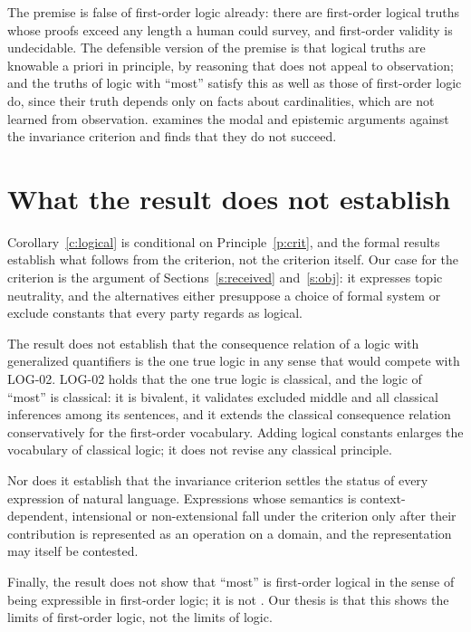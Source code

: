 \documentclass{situationist-preprint}
\begin{document}
\begin{reply}
The premise is false of first-order logic already: there are first-order logical truths whose proofs exceed any length a human could survey, and first-order validity is undecidable. The defensible version of the premise is that logical truths are knowable a priori in principle, by reasoning that does not appeal to observation; and the truths of logic with \enquote{most} satisfy this as well as those of first-order logic do, since their truth depends only on facts about cardinalities, which are not learned from observation. \citet{Sagi2015} examines the modal and epistemic arguments against the invariance criterion and finds that they do not succeed.
\end{reply}

\section{What the result does not establish}

Corollary~\ref{c:logical} is conditional on Principle~\ref{p:crit}, and the formal results establish what follows from the criterion, not the criterion itself. Our case for the criterion is the argument of Sections~\ref{s:received} and~\ref{s:obj}: it expresses topic neutrality, and the alternatives either presuppose a choice of formal system or exclude constants that every party regards as logical.

The result does not establish that the consequence relation of a logic with generalized quantifiers is the one true logic in any sense that would compete with LOG-02. LOG-02 holds that the one true logic is classical, and the logic of \enquote{most} is classical: it is bivalent, it validates excluded middle and all classical inferences among its sentences, and it extends the classical consequence relation conservatively for the first-order vocabulary. Adding logical constants enlarges the vocabulary of classical logic; it does not revise any classical principle.

Nor does it establish that the invariance criterion settles the status of every expression of natural language. Expressions whose semantics is context-dependent, intensional or non-extensional fall under the criterion only after their contribution is represented as an operation on a domain, and the representation may itself be contested.

Finally, the result does not show that \enquote{most} is first-order logical in the sense of being expressible in first-order logic; it is not \citep{BarwiseCooper1981}. Our thesis is that this shows the limits of first-order logic, not the limits of logic.
\end{document}
